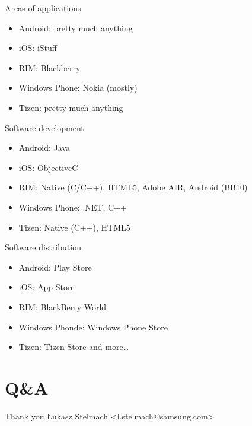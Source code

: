 \documentclass[presentation,aspectratio=43,12pt]{beamer}
\begin{document}
\begin{frame}[label=sec-4-3]{Areas of applications}
\begin{itemize}
\item Android: pretty much anything
\item iOS: iStuff
\item RIM: Blackberry
\item Windows Phone: Nokia (mostly)
\item Tizen: pretty much anything
\end{itemize}
\end{frame}

\begin{frame}[label=sec-4-4]{Software development}
\begin{itemize}
\item Android: Java
\item iOS: ObjectiveC
\item RIM: Native (C/C++), HTML5, Adobe AIR, Android (BB10)
\item Windows Phone: .NET, C++
\item Tizen: Native (C++), HTML5
\end{itemize}
\end{frame}

\begin{frame}[label=sec-4-5]{Software distribution}
\begin{itemize}
\item Android: Play Store
\item iOS: App Store
\item RIM: BlackBerry World
\item Windows Phonde: Windows Phone Store
\item Tizen: Tizen Store and more\ldots{}
\end{itemize}
\end{frame}

\section{Q\&A}
\label{sec-5}
\begin{frame}[label=sec-5-1]{Thank you}
Łukasz Stelmach <l.stelmach@samsung.com>
\end{frame}
\end{document}
